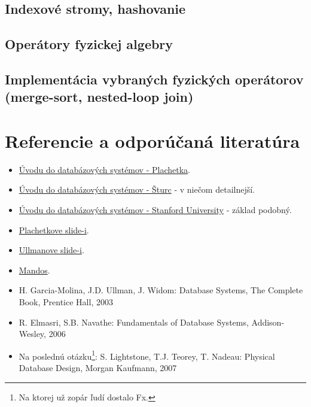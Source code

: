 \documentclass[10pt,a4paper]{article}
\begin{document}
\subsection{Indexové stromy, hashovanie}
\subsection{Operátory fyzickej algebry}
\subsection{Implementácia vybraných fyzických operátorov (merge-sort, nested-loop join)}


\clearpage
\section*{Referencie a odporúčaná literatúra}
\begin{itemize}                                
\item \href{http://www.dcs.fmph.uniba.sk/~plachetk/TEACHING/DB2011/index.html}{Úvodu do databázových systémov - Plachetka}.        
\item \href{http://www.dcs.fmph.uniba.sk/~sturc/databazy/uvod/}{Úvodu do databázových systémov - Šturc} - v niečom detailnejší.        
\item \href{http://infolab.stanford.edu/~widom/cs145/}{Úvodu do databázových systémov - Stanford University} - základ podobný.


\item \href{http://csip.sk/uploads/plachetka\_uvod\_do\_databaz\_2011.pdf}{Plachetkove slide-i}.
\item \href{http://csip.sk/uploads/ullman.pdf}{Ullmanove slide-i}.
\item \href{http://fmfi-uk.hq.sk/Informatika/Uvod\%20Do\%20Databazovych\%20Systemov/prednasky/}{Mandos}.
\item H. Garcia-Molina, J.D. Ullman, J. Widom: Database Systems, The Complete Book, Prentice Hall, 2003
\item R. Elmasri, S.B. Navathe: Fundamentals of Database Systems, Addison-Wesley, 2006
\item Na poslednú otázku\footnote{
Na ktorej už zopár ľudí dostalo Fx.
}: S. Lightstone, T.J. Teorey, T. Nadeau: Physical Database Design, Morgan Kaufmann, 2007
\end{itemize}
\end{document}
